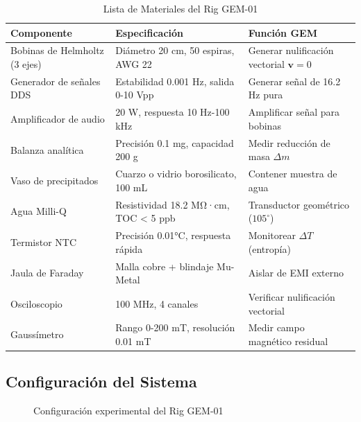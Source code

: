 \documentclass[12pt, a4paper]{article}
\begin{document}
\begin{table}[h!]
\centering
\caption{Lista de Materiales del Rig GEM-01}
\begin{tabular}{@{}p{6cm}p{4cm}p{5cm}@{}}
\toprule
\textbf{Componente} & \textbf{Especificación} & \textbf{Función GEM} \\ \midrule
Bobinas de Helmholtz (3 ejes) & Diámetro 20 cm, 50 espiras, AWG 22 & Generar nulificación vectorial $\mathbf{v}=0$ \\ \addlinespace
Generador de señales DDS & Estabilidad 0.001 Hz, salida 0-10 Vpp & Generar señal de 16.2 Hz pura \\ \addlinespace
Amplificador de audio & 20 W, respuesta 10 Hz-100 kHz & Amplificar señal para bobinas \\ \addlinespace
Balanza analítica & Precisión 0.1 mg, capacidad 200 g & Medir reducción de masa $\Delta m$ \\ \addlinespace
Vaso de precipitados & Cuarzo o vidrio borosilicato, 100 mL & Contener muestra de agua \\ \addlinespace
Agua Milli-Q & Resistividad 18.2 MΩ·cm, TOC < 5 ppb & Transductor geométrico ($105^\circ$) \\ \addlinespace
Termistor NTC & Precisión 0.01°C, respuesta rápida & Monitorear $\Delta T$ (entropía) \\ \addlinespace
Jaula de Faraday & Malla cobre + blindaje Mu-Metal & Aislar de EMI externo \\ \addlinespace
Osciloscopio & 100 MHz, 4 canales & Verificar nulificación vectorial \\ \addlinespace
Gaussímetro & Rango 0-200 mT, resolución 0.01 mT & Medir campo magnético residual \\ \bottomrule
\end{tabular}
\end{table}

\subsection{Configuración del Sistema}

\begin{figure}[h!]
\centering
{}
\caption{Configuración experimental del Rig GEM-01}
\end{figure}
\end{document}
